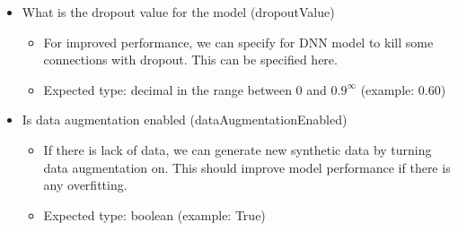 \begin{itemize}
    \item What is the dropout value for the model (dropoutValue)
    \begin{itemize}
        \item For improved performance, we can specify for DNN model to kill some connections with dropout. This can be specified here.
        \item Expected type: decimal in the range between 0 and \(0.9^{\infty}\) (example: 0.60)
    \end{itemize}
    
    \item Is data augmentation enabled (dataAugmentationEnabled)
    \begin{itemize}
        \item If there is lack of data, we can generate new synthetic data by turning data augmentation on. This should improve model performance if there is any overfitting.
        \item Expected type: boolean (example: True)
    \end{itemize}
\end{itemize}